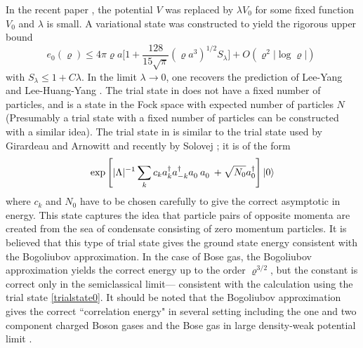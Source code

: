 \documentclass[11pt]{article}
\numberwithin{equation}{section}
\newcommand{\ann}{a^{\hphantom{+}}}
\newcommand{\cre}{a^{\dagger}}
\newcommand{\beq}{\begin{equation}}
\newcommand{\eeq}{\end{equation}}
\renewcommand\rho\varrho
\theoremstyle{definition}
\begin{document}
In the recent paper \cite{ESY},  the potential $V$ was replaced by $\lambda V_0$ for some fixed function $V_0$ and 
$\lambda$ is small.  A variational state was constructed to yield  the rigorous
upper bound 
\beq
e_0(\rho) \le 4\pi\varrho a \Big [1+
\frac{128}{15\sqrt{\pi}}( \varrho a^3)^{1/2}S_\lambda \Big ]
 + O(\varrho^2|\log \varrho| )  \;
\label{E-1}
\eeq
with $S_\lambda \leq 1+C\lambda$.
In the limit $\lambda \to 0$, one recovers the prediction of Lee-Yang \cite{LYang} and  Lee-Huang-Yang \cite{LHY}. 
The trial state in \cite{ESY}  does not have a
fixed number of particles, and is a state in the Fock space
with expected number of particles  $N$ (Presumably a  trial state with a  fixed number of particles
can be constructed with a similar idea).
The trial state in \cite{ESY} is similar to the trial state used by Girardeau and Arnowitt \cite{GA} 
and  recently by Solovej \cite{Sol}; it is of the form 
\beq\label{trialstate0}
 \exp \left [ |\Lambda|^{-1}  \sum_k  {c_k}  \cre_k\cre_{-k}\ann_0\ann_0  +  \sqrt{N_0}\cre_0  \right  ] |0\rangle
\eeq 
where  $c_k$ and $N_0$  have to be chosen carefully to give the correct asymptotic in energy.  This state captures  the idea that 
particle pairs of opposite momenta  are created from the sea of condensate consisting of  zero momentum particles.  It is believed that this type of trial state gives the ground state energy consistent with the 
Bogoliubov approximation. In the case of Bose gas,  the Bogoliubov approximation yields  
the correct energy up to  the order $\rho^{3/2}$, but the constant is correct only in the semiclassical limit---
consistent with the calculation using the trial state \eqref{trialstate0}.   
It should be noted that the Bogoliubov approximation gives the  correct ``correlation  energy"  in several 
setting including the one and  two component charged Boson gases  \cite{LS1, LS2, Sol} and 
the Bose gas  in  large density-weak potential limit \cite{GS}.
\end{document}
